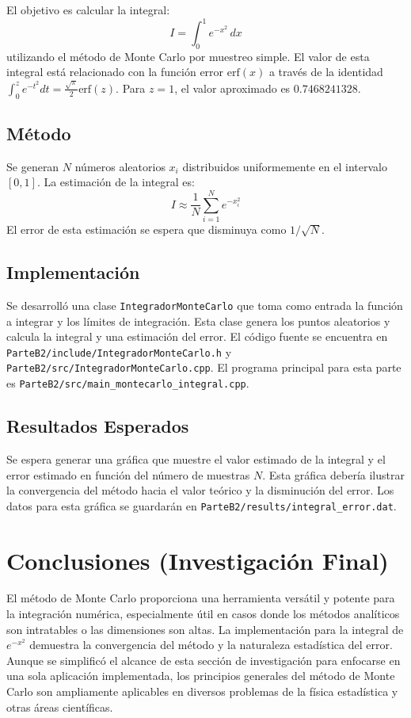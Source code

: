 \documentclass[11pt,a4paper]{article}
\begin{document}
El objetivo es calcular la integral:
\[ I = \int_0^1 e^{-x^2}\,dx \]
utilizando el método de Monte Carlo por muestreo simple. El valor de esta integral está relacionado con la función error $\text{erf}(x)$ a través de la identidad $\int_0^z e^{-t^2}dt = \frac{\sqrt{\pi}}{2}\text{erf}(z)$.
Para $z=1$, el valor aproximado es $0.7468241328$.

\subsection{Método}
Se generan $N$ números aleatorios $x_i$ distribuidos uniformemente en el intervalo $[0,1]$. La estimación de la integral es:
\[ I \approx \frac{1}{N} \sum_{i=1}^N e^{-x_i^2} \]
El error de esta estimación se espera que disminuya como $1/\sqrt{N}$.

\subsection{Implementación}
Se desarrolló una clase \texttt{IntegradorMonteCarlo} que toma como entrada la función a integrar y los límites de integración. Esta clase genera los puntos aleatorios y calcula la integral y una estimación del error. El código fuente se encuentra en \texttt{ParteB2/include/IntegradorMonteCarlo.h} y \texttt{ParteB2/src/IntegradorMonteCarlo.cpp}. El programa principal para esta parte es \texttt{ParteB2/src/main\_montecarlo\_integral.cpp}.

\subsection{Resultados Esperados}
Se espera generar una gráfica que muestre el valor estimado de la integral y el error estimado en función del número de muestras $N$. Esta gráfica debería ilustrar la convergencia del método hacia el valor teórico y la disminución del error. Los datos para esta gráfica se guardarán en \texttt{ParteB2/results/integral\_error.dat}.


\section{Conclusiones (Investigación Final)}
El método de Monte Carlo proporciona una herramienta versátil y potente para la integración numérica, especialmente útil en casos donde los métodos analíticos son intratables o las dimensiones son altas. La implementación para la integral de $e^{-x^2}$ demuestra la convergencia del método y la naturaleza estadística del error. Aunque se simplificó el alcance de esta sección de investigación para enfocarse en una sola aplicación implementada, los principios generales del método de Monte Carlo son ampliamente aplicables en diversos problemas de la física estadística y otras áreas científicas.
\end{document}

